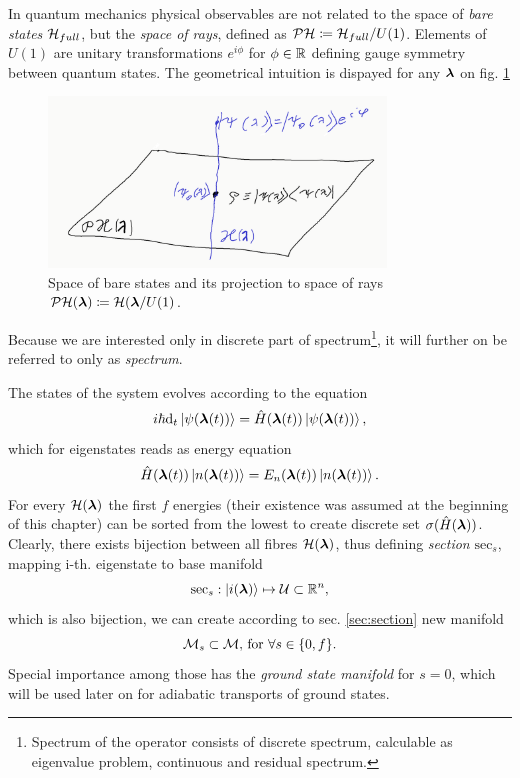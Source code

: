In quantum mechanics physical observables are not related to the space of \emph{bare states} $\mathcal{H}_{full}$, but the \emph{space of rays}, defined as $\mathcal{PH}\coloneqq \mathcal{H}_{full}/U(1)$. Elements of $U(1)$ are unitary transformations $e^{i\phi}$ for $\phi\in\mathbb{R}$ defining gauge symmetry between quantum states. The geometrical intuition is dispayed for any ${\bm\lambda}$ on fig. \ref{fig:projectiveHilbertSpace}
\begin{figure}[h]
    \centering
    \includegraphics[width=0.8\textwidth]{../img/projectiveHilbertSpace.png}
\caption{Space of bare states and its projection to space of rays $\mathcal{PH}({\bm\lambda})\coloneqq \mathcal{H}({\bm\lambda}/U(1)$.}
    \label{fig:projectiveHilbertSpace}
\end{figure}

Because we are interested only in discrete part of spectrum\footnote{Spectrum of the operator consists of discrete spectrum, calculable as eigenvalue problem, continuous and residual spectrum.}, it will further on be referred to only as \emph{spectrum}. 

The states of the system evolves according to the \Schrodinger equation
\begin{equation}
    i\hbar \mathrm{d}_t\ket{\psi({\bm\lambda}(t))} = \hat{H}({\bm\lambda}(t))\ket{\psi({\bm\lambda}(t))},
    \label{eq:schrodinger}
\end{equation}
which for eigenstates reads as energy \Schrodinger equation
\begin{equation}
    \hat{H}({\bm\lambda}(t))\ket{n({\bm\lambda}(t))}=E_n({\bm\lambda}(t))\ket{n({\bm\lambda}(t))}.
    \label{eq:energySchrodinger}
\end{equation}
For every $\mathcal{H}({\bm\lambda})$ the first $f$ energies (their existence was assumed at the beginning of this chapter) can be sorted from the lowest to create discrete set $\sigma(\hat{H}({\bm\lambda}))$. Clearly, there exists bijection between all fibres $\mathcal{H}({\bm\lambda})$, thus defining \emph{section} $\mathrm{sec}_s$, mapping i-th. eigenstate to base manifold 
$$\mathrm{sec}_s: \ket{i({\bm\lambda})}\mapsto \mathcal{U}\subset \mathbb{R}^n,$$
which is also bijection, we can create according to sec. \ref{sec:section} new manifold
$$\mathcal{M}_s\subset \mathcal{M} \text{, for } \forall s\in\{0,f\}.$$
Special importance among those has the \emph{ground state manifold} for $s=0$, which will be used later on for adiabatic transports of ground states. 

